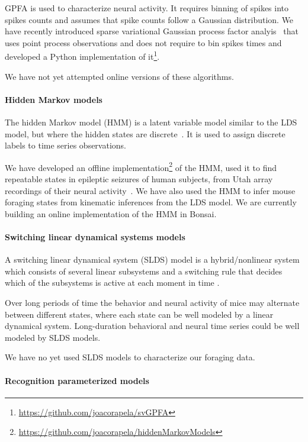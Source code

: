 GPFA is used to characterize neural activity. It requires binning of spikes
into spikes counts and assumes that spike counts follow a Gaussian
distribution. We have recently introduced sparse variational Gaussian process
factor analyis~\citep{dunckerAndSahani18} that uses point process observations
and does not require to bin spikes times and developed a Python implementation
of it\footnote{\url{https://github.com/joacorapela/svGPFA}}.

We have not yet attempted online versions of these algorithms.

\paragraph{Hidden Markov models}

The hidden Markov model (HMM) is a latent variable model similar to the LDS
model, but where the hidden states are discrete~\citep[][Chapter 13]{bishop06}. It is
used to assign discrete labels to time series observations.

We have developed an offline
implementation\footnote{\url{https://github.com/joacorapela/hiddenMarkovModels}}
of the HMM, used it to find repeatable states in epileptic seizures of human
subjects, from Utah array recordings of their neural
activity~\citep{rapelaAndTodorov19-epilepsy-hmm}. We have also used the HMM to
infer mouse foraging states from kinematic inferences from the LDS model. We
are currently building an online implementation of the HMM in Bonsai.

\paragraph{Switching linear dynamical systems models}

A switching linear dynamical system (SLDS) model is a hybrid/nonlinear system which
consists of several linear subsystems and a switching rule that decides which
of the subsystems is active at each moment in time \citep[Section
18.6]{murphy12}.

Over long periods of time the behavior and neural activity of mice may
alternate between different states, where each state can be well modeled by a
linear dynamical system. Long-duration behavioral and neural time series could
be well modeled by SLDS models.

We have no yet used SLDS models to characterize our foraging data.

\paragraph{Recognition parameterized models}

